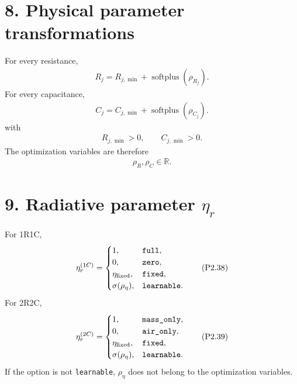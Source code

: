 \documentclass[11pt]{article}
\begin{document}
\section*{8. Physical parameter transformations}
For every resistance,
\begin{align}
\boxed{R_j=R_{j,\min}+\operatorname{softplus}(\rho_{R_j}).}
\tag{P2.36}
\end{align}
For every capacitance,
\begin{align}
\boxed{C_j=C_{j,\min}+\operatorname{softplus}(\rho_{C_j}).}
\tag{P2.37}
\end{align}
with
\begin{align}
R_{j,\min}>0,\qquad C_{j,\min}>0.
\end{align}
The optimization variables are therefore
\begin{align}
\rho_R,\rho_C\in\mathbb R.
\end{align}

\section*{9. Radiative parameter \(\eta_r\)}
For 1R1C,
\begin{align}
\eta_r^{(1C)}=\begin{cases}
1,&\texttt{full},\\
0,&\texttt{zero},\\
\eta_{\rm fixed},&\texttt{fixed},\\
\sigma(\rho_\eta),&\texttt{learnable}.
\end{cases}
\tag{P2.38}
\end{align}
For 2R2C,
\begin{align}
\eta_r^{(2C)}=\begin{cases}
1,&\texttt{mass\_only},\\
0,&\texttt{air\_only},\\
\eta_{\rm fixed},&\texttt{fixed},\\
\sigma(\rho_\eta),&\texttt{learnable}.
\end{cases}
\tag{P2.39}
\end{align}
If the option is not \texttt{learnable}, \(\rho_\eta\) does not belong to the optimization variables.
\end{document}
